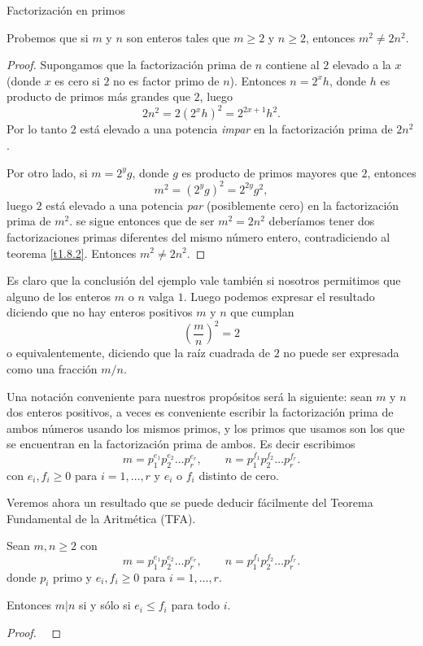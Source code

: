 \begin{section}{Factorización en primos}
\begin{ejemplo} Probemos que si $m$ y $n$ son enteros tales que
$m\ge 2$ y $n\ge 2$, entonces $m^2 \not=2n^2$.
\end{ejemplo}
\begin{proof} Supongamos que la factorización prima de $n$
contiene al $2$ elevado a la $x$ (donde $x$ es cero si $2$ no es
factor primo de $n$). Entonces $n=2^xh$, donde $h$ es producto de
primos más grandes que $2$, luego
$$
2n^2=2(2^xh)^2= 2^{2x+1}h^2.
$$
Por lo tanto $2$ está elevado a una potencia {\it impar} en la
factorización prima de $2n^2$.

Por otro lado, si $m=2^yg$, donde $g$ es producto de primos
mayores que $2$, entonces
$$
m^2= (2^yg)^2 = 2^{2y}g^2,
$$
luego $2$ está elevado a una potencia {\it par} (posiblemente cero)
en la factorización prima de $m^2$. se sigue entonces que de ser
$m^2 = 2n^2$ deberíamos tener dos factorizaciones primas
diferentes del mismo número entero, contradiciendo al teorema
\ref{t1.8.2}. Entonces $m^2 \not= 2n^2$.
\end{proof}

Es claro que la conclusión del {ejemplo}  vale también si nosotros
permitimos que alguno de los enteros $m$ o $n$ valga $1$. Luego
podemos expresar el resultado diciendo que no hay enteros
positivos $m$ y $n$ que cumplan
$$
\left(\frac{m}{n}\right)^2 =2
$$
o equivalentemente, diciendo que la raíz cuadrada de $2$ no puede
ser expresada como una fracción $m/n$.


Una notación conveniente para nuestros propósitos será la siguiente: sean $m$ y $n$ dos enteros positivos, a veces es conveniente escribir la factorización prima de ambos números usando los mismos primos, y los primos que usamos son los que se encuentran en la factorización prima de ambos. Es decir  escribimos
$$
m=p_1^{e_1}p_2^{e_2}\ldots p_r^{e_r},\qquad
n=p_1^{f_1}p_2^{f_2}\ldots p_r^{f_r}.
$$
con $e_i,f_i \ge 0$ para $i=1,\ldots,r$ y $e_i$ o $f_i$ distinto de cero. 
 
Veremos ahora un resultado que se puede deducir fácilmente del Teorema Fundamental de la Aritmética (TFA).

\begin{proposicion} Sean $m,n \ge2$ con
$$
m=p_1^{e_1}p_2^{e_2}\ldots p_r^{e_r},\qquad
n=p_1^{f_1}p_2^{f_2}\ldots p_r^{f_r}.
$$
donde $p_i$ primo y $e_i,f_i \ge 0$ para $i=1,\ldots,r$. 

Entonces $m|n$ si y sólo si $e_i \le f_i$ para todo $i$.
\end{proposicion}
\begin{proof}
\
	

\end{proof}
\end{section}
